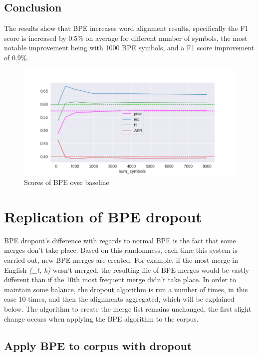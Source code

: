 \subsection{Conclusion}

The results show that BPE increases word alignment results, specifically the F1 score is increased by 0.5\% on average for different number of symbols, the most notable improvement being with 1000 BPE symbols, and a F1 score improvement of 0.9\%.

\begin{figure}[!ht]
    \centering
    \includegraphics[width=14cm]{figures/eng_deu_fastalign.png}
    \caption{Scores of BPE over baseline}
\end{figure}

\section{Replication of BPE dropout}

BPE dropout's difference with regards to normal BPE is the fact that some merges don't take place. Based on this randomness, each time this system is carried out, new BPE merges are created. For example, if the most merge in English \emph{(\_t, h)} wasn't merged, the resulting file of BPE merges would be vastly different than if the 10th most frequent merge didn't take place. In order to maintain some balance, the dropout algorithm is run a number of times, in this case 10 times, and then the alignments aggregated, which will be explained below. The algorithm to create the merge list remains unchanged, the first slight change occurs when applying the BPE algorithm to the corpus.

\subsection{Apply BPE to corpus with dropout}

